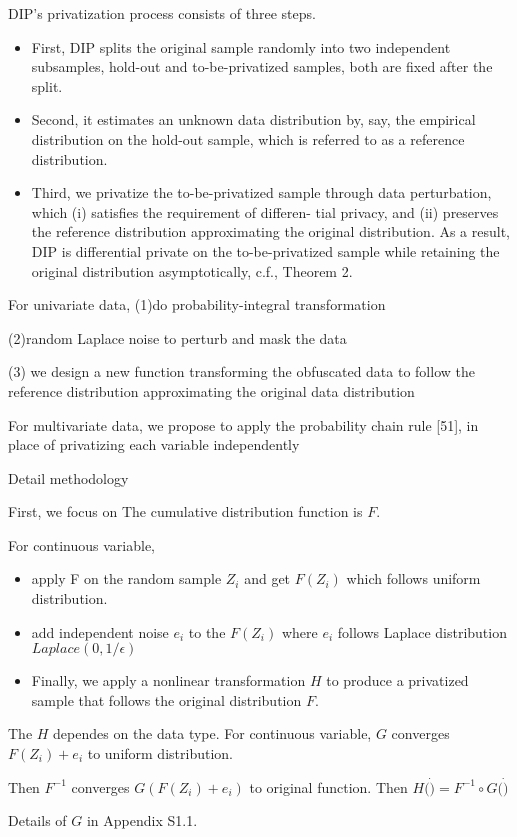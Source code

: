 
DIP’s privatization process consists of three steps. 
\begin{itemize}
    \item First, DIP splits the original sample randomly into two independent subsamples, hold-out and to-be-privatized samples, both are fixed after the split. 
    \item Second, it estimates an unknown data distribution by, say, the empirical distribution on the hold-out sample, which is referred to as a reference distribution. \item Third, we privatize the to-be-privatized sample through data perturbation, which (i) satisfies the requirement of differen- tial privacy, and (ii) preserves the reference distribution approximating the original distribution. As a result, DIP is differential private on the to-be-privatized sample while retaining the original distribution asymptotically, c.f., Theorem 2.
\end{itemize}



For univariate data, 
(1)do probability-integral transformation

(2)random Laplace noise to perturb and mask the data

(3) we design a new function transforming the obfuscated data to follow the reference distribution approximating the original data distribution


For multivariate data,
we propose to apply the probability chain rule [51], in place of privatizing each variable independently


Detail methodology

First, we focus on  The cumulative distribution function is $F$.

For continuous variable,
\begin{itemize}
    \item apply F on the random sample $Z_i$ and get $F(Z_i)$ which follows uniform distribution.
    \item add independent noise $e_i$ to the $F(Z_i)$ where $e_i$ follows Laplace distribution $Laplace(0,1/\epsilon)$
    \item Finally, we apply a nonlinear transformation $H$ to produce a privatized sample that follows the original distribution $F$.
\end{itemize}

The $H$ dependes on the data type.
For continuous variable,
$G$ converges $F(Z_i) + e_i$ to uniform distribution.

Then $F^{-1}$ converges $G(F(Z_i) + e_i)$ to original function.
Then 
$H(\dot) = F^{-1} \circ G(\dot)$

Details of $G$ in Appendix S1.1.


